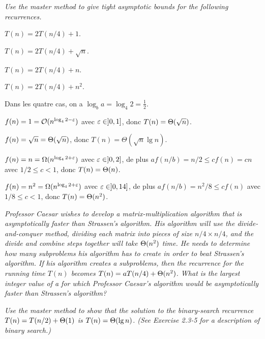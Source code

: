 \begin{description}
 
   {\itshape Use the master method to give tight asymptotic bounds for the following recurrences.}
      \begin{Al}
      \item $T(n) = 2T(n/4) + 1$.
      \item $T(n) = 2T(n/4) + \sqrt{n}$.
      \item $T(n) = 2T(n/4) + n$.
      \item $T(n) = 2T(n/4) + n^2$.
     \end{Al}
    
    \begin{ex}
      Dans les quatre cas, on a $\log_b a = \log_4 2 = \frac{1}{2}$.
      \begin{Al}
    \item $f(n) = 1 = \mathcal{O} (n^{\log_4 2-\varepsilon})$ avec $\varepsilon \in ]0, 1]$, donc $T(n) = \Theta(\sqrt{n})$.
      \item $f(n) = \sqrt{n} = \Theta(\sqrt{n})$, donc $T(n) = \Theta(\sqrt{n}\lg n)$.
    \item $f(n) = n = \Omega(n^{\log_4 2+\varepsilon})$ avec $\varepsilon \in ]0,2]$,  de plus $af(n/b) = n/2 \le cf(n) = cn$ avec $ 1/2 \le c < 1 $, donc $T(n) = \Theta(n)$.
      \item $f(n) = n^2 = \Omega(n^{\log_4 2+\varepsilon})$ avec $\varepsilon \in ]0, 14] $, de plus $af(n/b) = n^2/8 \le c f(n)$ avec $ 1/8 \le c < 1$, donc $T(n) = \Theta(n^2)$.
      \end{Al}
    \end{ex}

   {\itshape Professor Caesar wishes to develop a matrix-multiplication algorithm that is asymptotically faster than Strassen’s algorithm. His algorithm will use the divide-and-conquer method, dividing each matrix into pieces of size $n/4 \times n/4$, and the divide and combine steps together will take $\Theta(n^2)$ time. He needs to determine how many subproblems his algorithm has to create in order to beat Strassen’s algorithm. If his algorithm creates a subproblems, then the recurrence for the running time $T(n)$ becomes $T(n) =  aT(n/4) + \Theta(n^2)$. What is the largest integer value of a for which Professor Caesar’s algorithm would be asymptotically faster than Strassen’s algorithm?}
    \begin{exrev}
      
    \end{exrev}
 
   {\itshape Use the master method to show that the solution to the binary-search recurrence $T(n) = T(n/2) + \Theta(1)$ is $T(n) = \Theta(\lg n)$. (See Exercise 2.3-5 for a description of binary search.)}


\end{description}
